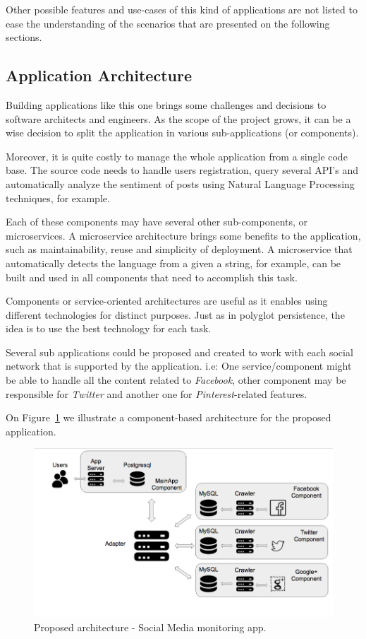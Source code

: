 Other possible features and use-cases of this kind of applications are not listed to ease the understanding of the scenarios that are presented on the following sections.

\subsection{Application Architecture}
Building applications like this one brings some challenges and decisions to software architects and engineers. As the scope of the project grows, it can be a wise decision to split the application in various sub-applications (or components).

Moreover, it is quite costly to manage the whole application from a single code base. The source code needs to handle users registration, query several API's and automatically analyze the sentiment of posts using Natural Language Processing techniques, for example. 

Each of these components may have several other sub-components, or microservices. A microservice architecture brings some benefits to the application, such as maintainability, reuse and simplicity of deployment. A microservice that automatically detects the language from a given a string, for example, can be built and used in all components that need to accomplish this task. 

Components or service-oriented architectures are useful as it enables using different technologies for distinct purposes. Just as in polyglot persistence, the idea is to use the best technology for each task.

Several sub applications could be proposed and created to work with each social network that is supported by the application. i.e: One service/component might be able to handle all the content related to \textit{Facebook}, other component may be responsible for \textit{Twitter} and another one for \textit{Pinterest}-related features. 

On Figure~\ref{fig:apparchitecture} we illustrate a component-based architecture for the proposed application.

\begin{figure}[ht!]
\centering
\includegraphics[width=120mm]{Imagens/apparchitecture.png}
\caption{Proposed architecture - Social Media monitoring app.\label{fig:apparchitecture}}
\end{figure}

